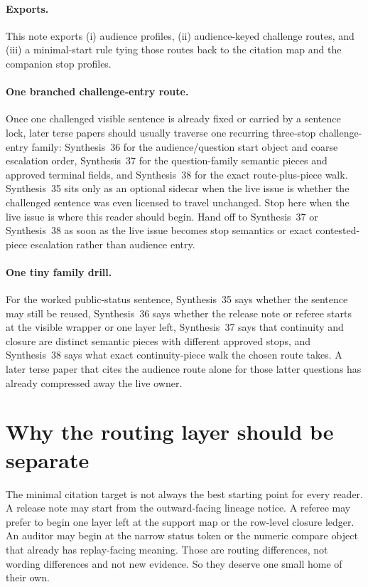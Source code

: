 \documentclass[11pt]{article}
\begin{document}
\paragraph{Exports.}
This note exports (i) audience profiles, (ii) audience-keyed challenge routes, and (iii) a minimal-start rule tying those routes back to the citation map and the companion stop profiles.

\paragraph{One branched challenge-entry route.}
Once one challenged visible sentence is already fixed or carried by a sentence lock, later terse papers should usually traverse one recurring three-stop challenge-entry family: Synthesis~36 for the audience/question start object and coarse escalation order, Synthesis~37 for the question-family semantic pieces and approved terminal fields, and Synthesis~38 for the exact route-plus-piece walk. Synthesis~35 sits only as an optional sidecar when the live issue is whether the challenged sentence was even licensed to travel unchanged. Stop here when the live issue is where this reader should begin. Hand off to Synthesis~37 or Synthesis~38 as soon as the live issue becomes stop semantics or exact contested-piece escalation rather than audience entry.\cite{series:sentencelocks,series:challengestops,series:challengebranches}

\paragraph{One tiny family drill.}
For the worked public-status sentence, Synthesis~35 says whether the sentence may still be reused, Synthesis~36 says whether the release note or referee starts at the visible wrapper or one layer left, Synthesis~37 says that continuity and closure are distinct semantic pieces with different approved stops, and Synthesis~38 says what exact continuity-piece walk the chosen route takes. A later terse paper that cites the audience route alone for those latter questions has already compressed away the live owner.\cite{series:sentencelocks,series:challengestops,series:challengebranches,series:workedexample}

\section{Why the routing layer should be separate}
The minimal citation target is not always the best starting point for every reader.
A release note may start from the outward-facing lineage notice.
A referee may prefer to begin one layer left at the support map or the row-level closure ledger.
An auditor may begin at the narrow status token or the numeric compare object that already has replay-facing meaning.
Those are routing differences, not wording differences and not new evidence.
So they deserve one small home of their own.
\end{document}
